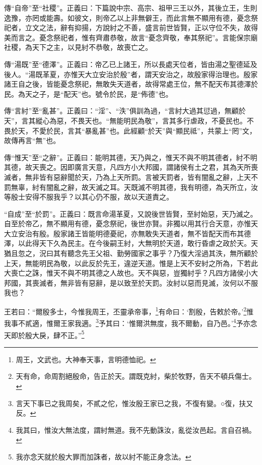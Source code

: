 {\noindent\zhuan{}\fzbyks 傳“自帝”至“社稷”。正義曰：下篇說中宗、高宗、祖甲三王以外，其後立王，生則逸豫，亦罔或能壽。如彼文，則帝乙以上非無僻王，而此言無不顯用有德，憂念祭祀者，立文之法，辭有抑揚，方說紂之不善，盛言前世皆賢，正以守位不失，故得美而言之。憂念祭祀者，惟有齊肅恭敬，故言“憂念齊敬，奉其祭祀”。言能保宗廟社稷，為天下之主，以見紂不恭敬，故喪亡之。 \par}

{\noindent\zhuan{}\fzbyks 傳“湯既”至“德澤”。正義曰：帝乙已上諸王，所以長處天位者，皆由湯之聖德延及後人。“湯既革夏，亦惟天大立安治於殷”者，謂天安治之，故殷家得治理也。殷家諸王自之後，皆能憂念祭祀，無敢失天道者，故得常處王位，無不配天布其德澤於民。為天之子，是“配天”也。號令於民，是“佈德”也。 \par}

{\noindent\zhuan{}\fzbyks 傳“言紂”至“亂甚”。正義曰：“淫”、“泆”俱訓為過，“言紂大過其愆過，無顧於天”，言其縱心為惡，不畏天也。“無能明民為敬”，言其多行虐政，不憂民也。不畏於天，不愛於民，言其“暴亂甚”也。此經顧“於天”與“顯民祗”，共蒙上“罔”文，故傳再言“無”也。 \par}

{\noindent\zhuan{}\fzbyks 傳“惟天”至“之辭”。正義曰：能明其德，天乃與之，惟天不與不明其德者，紂不明其德，故天喪之。因即廣言天意，凡四方小大邦國，謂諸侯有土之君，其為天所喪滅者，無非皆有惡辭聞於天，乃為上天所罰。言被天罰者，皆有闇亂之辭，上天不罰無辜，紂有闇亂之辭，故天滅之耳。天既滅不明其德，我有明德，為天所立，汝等殷士安得不服我乎？以其心仍不服，故以天道責之。 \par}

{\noindent\shu{}\fzkt “自成”至“於罰”。正義曰：既言命湯革夏，又說後世皆賢，至紂始惡，天乃滅之。自至於帝乙，無不顯用有德，憂念祭祀，後世亦賢。非獨以用其行合天意，亦惟天大立安治有殷。殷家諸王皆能明德憂祀，亦無敢失天道者，無不皆配天而布其德澤，以此得天下久為民主。在今後嗣王紂，大無明於天道，敢行昏虐之政於天。天猶且忽之，況曰其有聽念先王父祖、勤勞國家之事乎？乃復大淫過其泆，無所顧於上天，無能明民為敬，以此反於先王，違逆天道。惟是上天不安紂之所為，下若此大喪亡之誅，惟天不與不明其德之人故也。天不與惡，豈獨紂乎？凡四方諸侯小大邦國，其喪滅者，無非皆有惡辭，是以致至於天罰。汝紂以惡而見滅，汝何以不服我也？ \par}

王若曰：“爾殷多士，今惟我周王，丕靈承帝事，\footnote{周王，文武也。大神奉天事，言明德恤祀。}有命曰：‘割殷，告敕於帝。’\footnote{天有命，命周割絕殷命，告正於天。謂既克紂，柴於牧野，告天不頓兵傷士。}惟我事不貳適，惟爾王家我適。\footnote{言天下事已之我周矣，不貳之佗，惟汝殷王家已之我，不復有變。○復，扶又反。}予其曰：‘惟爾洪無度，我不爾動，自乃邑。’\footnote{我其曰，惟汝大無法度，謂紂無道。我不先動誅汝，亂從汝邑起。言自召禍。}予亦念天即於殷大戾，肆不正。”\footnote{我亦念天就於殷大罪而加誅者，故以紂不能正身念法。}


